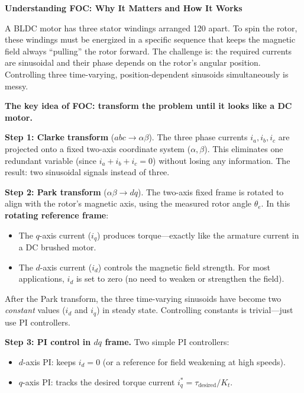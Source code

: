 \vspace{0.5em}
\begin{mdframed}[linewidth=1pt, innertopmargin=10pt, innerbottommargin=10pt]
\textbf{Understanding FOC: Why It Matters and How It Works}

\vspace{0.3em}
A BLDC motor has three stator windings arranged 120\textdegree{} apart. To spin the rotor, these windings must be energized in a specific sequence that keeps the magnetic field always ``pulling'' the rotor forward. The challenge is: the required currents are sinusoidal and their phase depends on the rotor's angular position. Controlling three time-varying, position-dependent sinusoids simultaneously is messy.

\textbf{The key idea of FOC: transform the problem until it looks like a DC motor.}

\textbf{Step 1: Clarke transform} ($abc \to \alpha\beta$). The three phase currents $i_a, i_b, i_c$ are projected onto a fixed two-axis coordinate system ($\alpha, \beta$). This eliminates one redundant variable (since $i_a + i_b + i_c = 0$) without losing any information. The result: two sinusoidal signals instead of three.

\textbf{Step 2: Park transform} ($\alpha\beta \to dq$). The two-axis fixed frame is rotated to align with the rotor's magnetic axis, using the measured rotor angle $\theta_e$. In this \textbf{rotating reference frame}:
\begin{itemize}[nosep]
    \item The $q$-axis current ($i_q$) produces torque---exactly like the armature current in a DC brushed motor.
    \item The $d$-axis current ($i_d$) controls the magnetic field strength. For most applications, $i_d$ is set to zero (no need to weaken or strengthen the field).
\end{itemize}

After the Park transform, the three time-varying sinusoids have become two \textit{constant} values ($i_d$ and $i_q$) in steady state. Controlling constants is trivial---just use PI controllers.

\textbf{Step 3: PI control in $dq$ frame.} Two simple PI controllers:
\begin{itemize}[nosep]
    \item $d$-axis PI: keeps $i_d = 0$ (or a reference for field weakening at high speeds).
    \item $q$-axis PI: tracks the desired torque current $i_q^* = \tau_{\text{desired}} / K_t$.
\end{itemize}


\end{mdframed}
